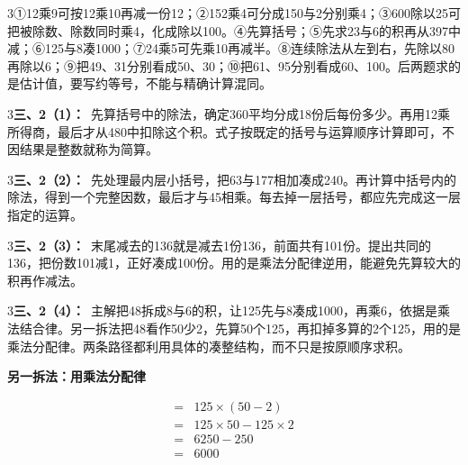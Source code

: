\documentclass[multi=snippet,border={5bp 20bp 5bp 5bp}]{standalone}
\newenvironment{snippet}[3]{\begin{minipage}{#1bp}\color{answerred}\fontsize{#2}{#3}\selectfont\raggedright}{\end{minipage}}
\begin{document}
\begin{snippet}{505}{11.5}{14}\begin{multicols}{3}\raggedcolumns ①12乘9可按12乘10再减一份12；②152乘4可分成150与2分别乘4；③600除以25可把被除数、除数同时乘4，化成除以100。④先算括号；⑤先求23与6的积再从397中减；⑥125与8凑1000；⑦24乘5可先乘10再减半。⑧连续除法从左到右，先除以80再除以6；⑨把49、31分别看成50、30；⑩把61、95分别看成60、100。后两题求的是估计值，要写约等号，不能与精确计算混同。\end{multicols}\end{snippet}
\begin{snippet}{505}{11.5}{14}\begin{multicols}{3}\raggedcolumns \textbf{三、2（1）：}\ 先算括号中的除法，确定360平均分成18份后每份多少。再用12乘所得商，最后才从480中扣除这个积。式子按既定的括号与运算顺序计算即可，不因结果是整数就称为简算。\end{multicols}\end{snippet}
\begin{snippet}{505}{11.5}{14}\begin{multicols}{3}\raggedcolumns \textbf{三、2（2）：}\ 先处理最内层小括号，把63与177相加凑成240。再计算中括号内的除法，得到一个完整因数，最后才与45相乘。每去掉一层括号，都应先完成这一层指定的运算。\end{multicols}\end{snippet}
\begin{snippet}{505}{11.5}{14}\begin{multicols}{3}\raggedcolumns \textbf{三、2（3）：}\ 末尾减去的136就是减去1份136，前面共有101份。提出共同的136，把份数101减1，正好凑成100份。用的是乘法分配律逆用，能避免先算较大的积再作减法。\end{multicols}\end{snippet}
\begin{snippet}{505}{11.5}{14}\begin{multicols}{3}\raggedcolumns \textbf{三、2（4）：}\ 主解把48拆成8与6的积，让125先与8凑成1000，再乘6，依据是乘法结合律。另一拆法把48看作50少2，先算50个125，再扣掉多算的2个125，用的是乘法分配律。两条路径都利用具体的凑整结构，而不只是按原顺序求积。\par \textbf{另一拆法：用乘法分配律}\par \[\begin{aligned}={}&125\times(50-2)\\={}&125\times50-125\times2\\={}&6250-250\\={}&6000\end{aligned}\]\end{multicols}\end{snippet}
\end{document}
